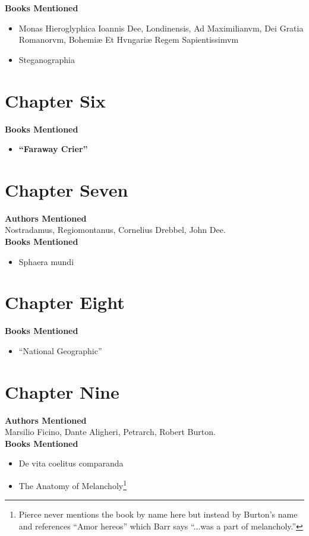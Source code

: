 \documentclass[12pt,makeidx]{extreport}
\begin{document}
\hspace{-1.5em}\textbf{Books Mentioned}
\begin{itemize}
\item Monas Hieroglyphica Ioannis Dee, Londinensis, Ad Maximilianvm, Dei Gratia Romanorvm, Bohemiæ Et Hvngariæ Regem Sapientissimvm \parencite{Dee1564}
\item Steganographia \parencite{Trithemius1608}
\end{itemize}

\section{Chapter Six}
\textbf{Books Mentioned}
\begin{itemize}
\item \textbf{``Faraway Crier''} \parencite{faraway}
\end{itemize}

\section{Chapter Seven}
\textbf{Authors Mentioned}\\
Nostradamus, Regiomontanus, Cornelius Drebbel, John Dee.
\\

\hspace{-1.5em}\textbf{Books Mentioned}
\begin{itemize}
\item Sphaera mundi \parencite{JSB1490}
\end{itemize}

\section{Chapter Eight}
\textbf{Books Mentioned}
\begin{itemize}
\item ``National Geographic'' \parencite{natgeo}
\end{itemize}

\section{Chapter Nine}
\textbf{Authors Mentioned}\\
Marsilio Ficino, Dante Aligheri, Petrarch, Robert Burton.
\\

\hspace{-1.5em}\textbf{Books Mentioned}
\begin{itemize}
\item De vita coelitus comparanda \parencite{Ficino1560}
\item The Anatomy of Melancholy\footnote{Pierce never mentions the book by name here but instead by Burton’s name and references ``Amor hereos'' which Barr says ``...was a part of melancholy.''} \parencite{Burton1863}
\end{itemize}
\end{document}
